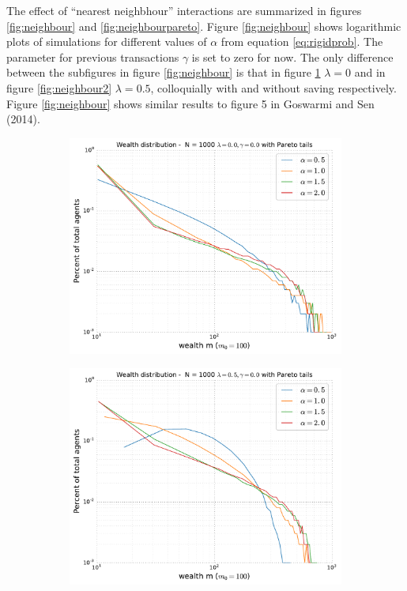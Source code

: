 \documentclass[10pt, a4paper]{amsart}
\begin{document}

The effect of ``nearest neighbhour'' interactions are summarized in figures \ref{fig:neighbour} and \ref{fig:neighbourpareto}. Figure \ref{fig:neighbour} shows logarithmic plots of simulations for different values of $\alpha$ from equation \ref{eq:rigidprob}. The parameter for previous transactions $\gamma$ is set to zero for now. The only difference between the subfigures in figure \ref{fig:neighbour} is that in figure \ref{fig:neighbour1} $\lambda=0$ and in figure \ref{fig:neighbour2} $\lambda=0.5$, colloquially with and without saving respectively. Figure \ref{fig:neighbour} shows similar results to figure 5 in Goswarmi and Sen (2014)\cite{GoswamiSen}.

\begin{figure}
\begin{subfigure}{.49\textwidth}
	\centering
	\includegraphics[width=\linewidth]{../figures/5d/5d_0-var-0.pdf}
	\caption{}
	\label{fig:neighbour1}
\end{subfigure}
\begin{subfigure}{.49\textwidth}
	\centering
	\includegraphics[width=\linewidth]{../figures/5d/5d_05-var-0.pdf}

\end{subfigure}
\end{figure}
\end{document}
